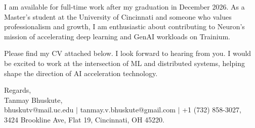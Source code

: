 \documentclass[11pt]{letter}
\begin{document}
\begin{letter}{}
I am available for full-time work after my graduation in December 2026. As a Master's student at the University of Cincinnati and someone who values professionalism and growth, I am enthusiastic about contributing to Neuron's mission of accelerating deep learning and GenAI workloads on Trainium.

Please find my CV attached below. I look forward to hearing from you. I would be excited to work at the intersection of ML and distributed systems, helping shape the direction of AI acceleration technology.

{\setlength{\parskip}{0pt}
Regards,\\
Tanmay Bhuskute,\\
bhuskutv@mail.uc.edu $\mid$ tanmay.v.bhuskute@gmail.com $\mid$ +1 (732) 858-3027,\\
3424 Brookline Ave, Flat 19, Cincinnati, OH 45220.
}

\end{letter}
\end{document}
